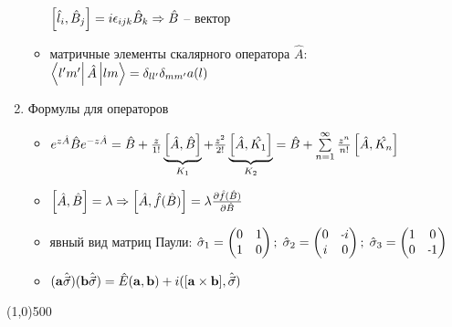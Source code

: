 \begin{enumerate}[label=\textbf{\underline{\arabic*.}}]
\begin{itemize}
            $ \left[ \hat{l}_{i}, \hat{B}_{j} \right] = i\epsilon_{ijk}\hat{B}_k \Rightarrow \hat{B} $ -- вектор
            \item матричные элементы скалярного оператора $\hat{A}$:
            $ \matrixel{l'm'}{\hat{A}}{lm} = \delta_{ll'}\delta_{mm'}a(l) $
        \end{itemize}
\item Формулы для операторов  \begin{itemize}
            \item
            $ e^{z\hat{A}}\hat{B}e^{-z\hat{A}} = \hat{B} + \frac{z}{1!}\underbrace{\left[ \hat{A}, \hat{B} \right]}_{K_1} + \frac{z^2}{2!}\underbrace{\left[ \hat{A}, \hat{K_1} \right]}_{K_2} = \hat{B}+\sum\limits_{n=1}^{\infty}\frac{z^n}{n!}\left[ \hat{A}, \hat{K_n} \right] $
            \item
            $ \left[ \hat{A}, \hat{B} \right]=\lambda \Rightarrow \left[ \hat{A}, \hat{f}(\hat{B}) \right]=\lambda \frac{\partial \hat{f}(\hat{B})}{\partial \hat{B}} $
            \item явный вид матриц Паули:
            $ \hat{\sigma}_1=\begin{pmatrix} 0&1\\1&0 \end{pmatrix};\; \hat{\sigma}_2=\begin{pmatrix} 0&\scalebox{0.75}[1.0]{-}i\\i&0 \end{pmatrix};\; \hat{\sigma}_3=\begin{pmatrix} 1&0\\0&\scalebox{0.75}[1.0]{-}1 \end{pmatrix} $
            \item
            $ (\mathbf{a}\hat{\vec{\sigma}})(\mathbf{b}\hat{\vec{\sigma}}) = \hat{E}(\mathbf{a},\mathbf{b}) + i([\mathbf{a}\times\mathbf{b}],\hat{\vec{\sigma}}) $
        \end{itemize}
\end{enumerate}
\vfill\line(1,0){500}

